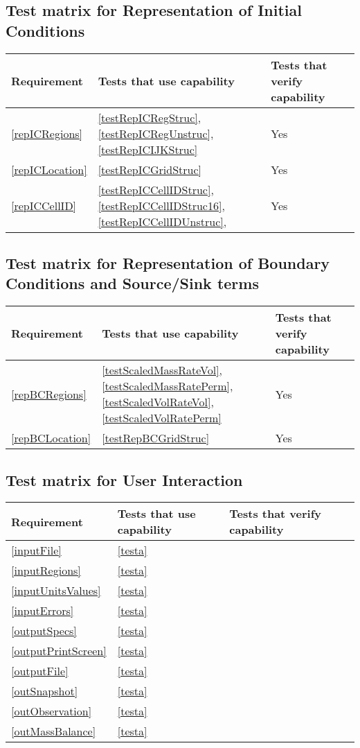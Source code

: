 \subsection{Test matrix for Representation of Initial Conditions}
\begin{tabular}{|l|l|l|l|}
	\hline
	Requirement & Tests that use capability & Tests that verify capability \\
	\hline
	\hline
	\ref{repICRegions} & \ref{testRepICRegStruc}, \ref{testRepICRegUnstruc}, \ref{testRepICIJKStruc}  & Yes \\
	\hline
	\ref{repICLocation} &  \ref{testRepICGridStruc} & Yes \\
	\hline
	\ref{repICCellID} & \ref{testRepICCellIDStruc}, \ref{testRepICCellIDStruc16}, \ref{testRepICCellIDUnstruc}, & Yes\\
	\hline
\end{tabular}

\subsection{Test matrix for Representation of Boundary Conditions and Source/Sink terms}
\begin{tabular}{|l|l|l|l|}
	\hline
	Requirement & Tests that use capability & Tests that verify capability \\
	\hline
	\hline
	\ref{repBCRegions}& \ref{testScaledMassRateVol}, \ref{testScaledMassRatePerm}, 
	\ref {testScaledVolRateVol}, \ref{testScaledVolRatePerm} & Yes \\
	\hline
	\ref{repBCLocation} & \ref{testRepBCGridStruc} & Yes \\
	\hline
\end{tabular}

\subsection{Test matrix for User Interaction}
\begin{tabular}{|l|l|l|l|}
	\hline
	Requirement & Tests that use capability & Tests that verify capability \\
	\hline
	\hline
		\ref{inputFile} & \ref{testa} \\
	\hline
		\ref{inputRegions} & \ref{testa} \\
	\hline
		\ref{inputUnitsValues} & \ref{testa} \\
	\hline
		\ref{inputErrors} & \ref{testa} \\
	\hline
		\ref{outputSpecs} & \ref{testa} \\
	\hline
		\ref{outputPrintScreen} & \ref{testa} \\
	\hline
		\ref{outputFile} & \ref{testa} \\
	\hline
		\ref{outSnapshot} & \ref{testa} \\
	\hline
		\ref{outObservation} & \ref{testa} \\
	\hline
		\ref{outMassBalance} & \ref{testa} \\
	\hline
\end{tabular}

